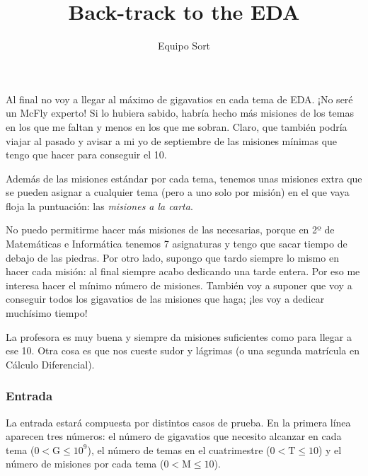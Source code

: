 \documentclass{article}
\title{Back-track to the EDA}
\author{Equipo Sort}
\date{}
\begin{document}
	\maketitle
	
	Al final no voy a llegar al máximo de gigavatios en cada tema de EDA. ¡No seré un McFly experto! Si lo hubiera sabido, habría hecho más misiones de los temas en los que me faltan y menos en los que me sobran. Claro, que también podría viajar al pasado y avisar a mi yo de septiembre de las misiones mínimas que tengo que hacer para conseguir el 10.
	
	
	Además de las misiones estándar por cada tema, tenemos unas misiones extra que se pueden asignar a cualquier tema (pero a uno solo por misión) en el que vaya floja la puntuación: las \textit{misiones a la carta}.
	
	No puedo permitirme hacer más misiones de las necesarias, porque en 2º de Matemáticas e Informática tenemos 7 asignaturas y tengo que sacar tiempo de debajo de las piedras. Por otro lado, supongo que tardo siempre lo mismo en hacer cada misión: al final siempre acabo dedicando una tarde entera. Por eso me interesa hacer el mínimo número de misiones. También voy a suponer que voy a conseguir todos los gigavatios de las misiones que haga; ¡les voy a dedicar muchísimo tiempo!
	
	La profesora es muy buena y siempre da misiones suficientes como para llegar a ese 10. Otra cosa es que nos cueste sudor y lágrimas (o una segunda matrícula en Cálculo Diferencial).\\
	
	\subsubsection*{Entrada}
	
	La entrada estará compuesta por distintos casos de prueba. En la primera línea aparecen tres números: el número de gigavatios que necesito alcanzar en cada tema ($0<\text{G}\leq 10^9$), el número de temas en el cuatrimestre ($0<\text{T}\leq 10$) y el número de misiones por cada tema ($0<\text{M}\leq 10$).
	
\end{document}
